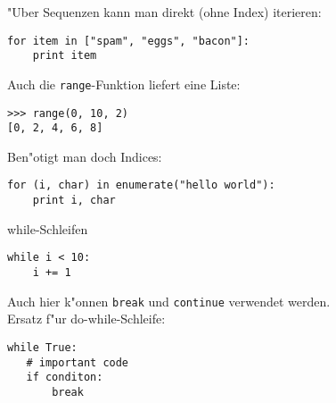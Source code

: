 \begin{frame}[fragile]
"Uber Sequenzen kann man direkt (ohne Index) iterieren:
\begin{lstlisting}[style=Python]
for item in ["spam", "eggs", "bacon"]:
    print item
\end{lstlisting}

Auch die \texttt{range}-Funktion liefert eine Liste:
\begin{lstlisting}[style=Shell]
>>> range(0, 10, 2)
[0, 2, 4, 6, 8]
\end{lstlisting}
Ben"otigt man doch Indices:
\begin{lstlisting}[style=Python]
for (i, char) in enumerate("hello world"):
    print i, char
\end{lstlisting}
\end{frame}

\begin{frame}[fragile]{while-Schleifen}
\begin{lstlisting}[style=Python]
while i < 10:
    i += 1
\end{lstlisting}
Auch hier k"onnen \lstinline{break} und \lstinline{continue} verwendet werden.\\[3mm]
Ersatz f"ur do-while-Schleife:
\begin{lstlisting}[style=Python]
while True:
   # important code
   if conditon:
       break
\end{lstlisting} 
\end{frame}

